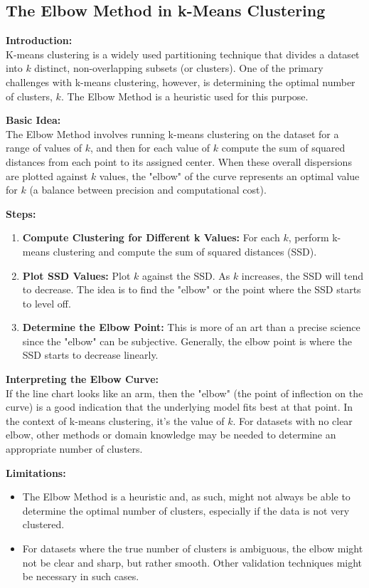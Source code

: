 


\subsection{The Elbow Method in k-Means Clustering}

\textbf{Introduction:}\\
K-means clustering is a widely used partitioning technique that divides a dataset into $k$ distinct, non-overlapping subsets (or clusters). One of the primary challenges with k-means clustering, however, is determining the optimal number of clusters, $k$. The Elbow Method is a heuristic used for this purpose.

\textbf{Basic Idea:}\\
The Elbow Method involves running k-means clustering on the dataset for a range of values of $k$, and then for each value of $k$ compute the sum of squared distances from each point to its assigned center. When these overall dispersions are plotted against $k$ values, the "elbow" of the curve represents an optimal value for $k$ (a balance between precision and computational cost).

\textbf{Steps:}
\begin{enumerate}
    \item \textbf{Compute Clustering for Different k Values:} For each $k$, perform k-means clustering and compute the sum of squared distances (SSD).
    \item \textbf{Plot SSD Values:} Plot $k$ against the SSD. As $k$ increases, the SSD will tend to decrease. The idea is to find the "elbow" or the point where the SSD starts to level off.
    \item \textbf{Determine the Elbow Point:} This is more of an art than a precise science since the "elbow" can be subjective. Generally, the elbow point is where the SSD starts to decrease linearly.
\end{enumerate}

\textbf{Interpreting the Elbow Curve:}\\
If the line chart looks like an arm, then the "elbow" (the point of inflection on the curve) is a good indication that the underlying model fits best at that point. In the context of k-means clustering, it's the value of $k$. For datasets with no clear elbow, other methods or domain knowledge may be needed to determine an appropriate number of clusters.

\textbf{Limitations:}
\begin{itemize}
    \item The Elbow Method is a heuristic and, as such, might not always be able to determine the optimal number of clusters, especially if the data is not very clustered.
    \item For datasets where the true number of clusters is ambiguous, the elbow might not be clear and sharp, but rather smooth. Other validation techniques might be necessary in such cases.
\end{itemize}

